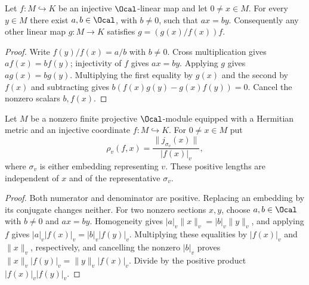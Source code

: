\begin{lemma}
\label{lem:integral-line-coordinates}
\leanok
Let $f:M\hookrightarrow K$ be an injective $\Ocal$-linear map and let
$0\ne x\in M$. For every $y\in M$ there exist $a,b\in\Ocal$, with
$b\ne0$, such that $ax=by$. Consequently any other linear map $g:M\to K$
satisfies $g=(g(x)/f(x))f$.
\end{lemma}
\begin{proof}
Write $f(y)/f(x)=a/b$ with $b\ne0$. Cross multiplication gives
$a f(x)=b f(y)$; injectivity of $f$ gives $ax=by$. Applying $g$ gives
$a g(x)=b g(y)$. Multiplying the first equality by $g(x)$ and the second
by $f(x)$ and subtracting gives
$b(f(x)g(y)-g(x)f(y))=0$. Cancel the nonzero scalars $b,f(x)$.
\end{proof}

\begin{lemma}
\label{lem:line-coordinate-length}
\leanok
Let $M$ be a nonzero finite projective $\Ocal$-module equipped with a
Hermitian metric and an injective coordinate $f:M\hookrightarrow K$.
For $0\ne x\in M$ put
\[
 \rho_v(f,x)=\frac{\|j_{\sigma_v}(x)\|}{|f(x)|_v},
\]
where $\sigma_v$ is either embedding representing $v$. These positive
lengths are independent of $x$ and of the representative $\sigma_v$.
\end{lemma}
\begin{proof}
Both numerator and denominator are positive. Replacing an embedding by
its conjugate changes neither. For two nonzero sections $x,y$, choose
$a,b\in\Ocal$ with $b\ne0$ and $ax=by$. Homogeneity gives
$|a|_v\|x\|_v=|b|_v\|y\|_v$, and applying $f$ gives
$|a|_v|f(x)|_v=|b|_v|f(y)|_v$. Multiplying these equalities by
$|f(x)|_v$ and $\|x\|_v$, respectively, and cancelling the nonzero
$|b|_v$ proves $\|x\|_v|f(y)|_v=\|y\|_v|f(x)|_v$.
Divide by the positive product $|f(x)|_v|f(y)|_v$.
\end{proof}

